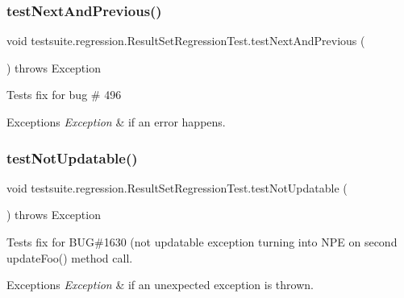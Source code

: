 \subsubsection{\texorpdfstring{test\+Next\+And\+Previous()}{testNextAndPrevious()}}
{\footnotesize\ttfamily void testsuite.\+regression.\+Result\+Set\+Regression\+Test.\+test\+Next\+And\+Previous (\begin{DoxyParamCaption}{ }\end{DoxyParamCaption}) throws Exception}

Tests fix for bug \# 496


\begin{DoxyExceptions}{Exceptions}
{\em Exception} & if an error happens. \\
\hline
\end{DoxyExceptions}
\mbox{\label{classtestsuite_1_1regression_1_1_result_set_regression_test_a87b5a0b26c6031bfbaef6527e26abb40}} 
\subsubsection{\texorpdfstring{test\+Not\+Updatable()}{testNotUpdatable()}}
{\footnotesize\ttfamily void testsuite.\+regression.\+Result\+Set\+Regression\+Test.\+test\+Not\+Updatable (\begin{DoxyParamCaption}{ }\end{DoxyParamCaption}) throws Exception}

Tests fix for B\+UG\#1630 (not updatable exception turning into N\+PE on second update\+Foo() method call.


\begin{DoxyExceptions}{Exceptions}
{\em Exception} & if an unexpected exception is thrown. \\
\hline
\end{DoxyExceptions}
\mbox{\label{classtestsuite_1_1regression_1_1_result_set_regression_test_aa4e05afadbebf3dfcb1ab53ba94e8787}} 
